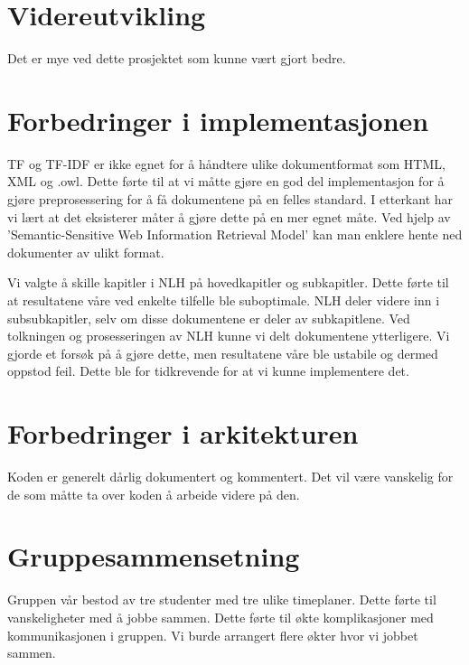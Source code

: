 \section{Videreutvikling}
\label{improvements}

Det er mye ved dette prosjektet som kunne vært gjort bedre. 

\section{Forbedringer i implementasjonen}
TF og TF-IDF er ikke egnet for å håndtere ulike dokumentformat som HTML, XML og .owl. Dette førte til at vi måtte gjøre en god del implementasjon for å gjøre preprosessering for å få dokumentene på en felles standard. I etterkant har vi lært at det eksisterer måter å gjøre dette på en mer egnet måte. Ved hjelp av 'Semantic-Sensitive Web Information Retrieval Model' kan man enklere hente ned dokumenter av ulikt format. %

Vi valgte å skille kapitler i NLH på hovedkapitler og subkapitler. Dette førte til at resultatene våre ved enkelte tilfelle ble suboptimale. NLH deler videre inn i subsubkapitler, selv om disse dokumentene er deler av subkapitlene. Ved tolkningen og prosesseringen av NLH kunne vi delt dokumentene ytterligere. Vi gjorde et forsøk på å gjøre dette, men resultatene våre ble ustabile og dermed oppstod feil. Dette ble for tidkrevende for at vi kunne implementere det. 

\section{Forbedringer i arkitekturen}
Koden er generelt dårlig dokumentert og kommentert. Det vil være vanskelig for de som måtte ta over koden å arbeide videre på den. 


\section{Gruppesammensetning}
Gruppen vår bestod av tre studenter med tre ulike timeplaner. Dette førte til vanskeligheter med å jobbe sammen. Dette førte til økte komplikasjoner med kommunikasjonen i gruppen. Vi burde arrangert flere økter hvor vi jobbet sammen. 